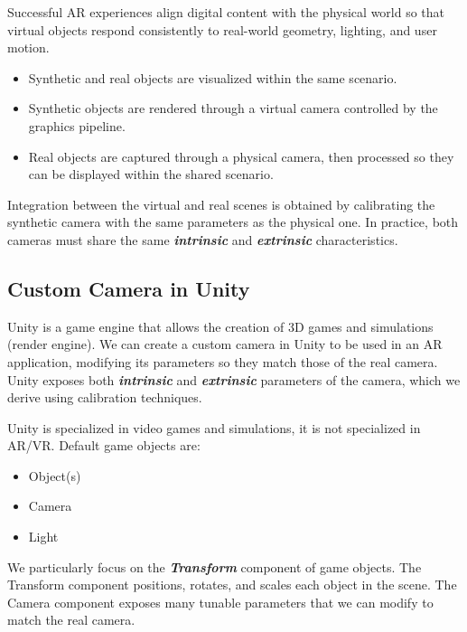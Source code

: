 \documentclass[11pt,a4paper]{article}
\theoremstyle{definition}
\theoremstyle{plain}
\theoremstyle{remark}
\begin{document}
\begin{tcolorbox}[colback=blue!4!white,colframe=blue!60!black,title=\textbf{Key Concept: Mixed Reality}]
Successful AR experiences align digital content with the physical world so that
virtual objects respond consistently to real-world geometry, lighting, and user motion.
\end{tcolorbox}

\begin{itemize}
    \item Synthetic and real objects are visualized within the same scenario.
    \item Synthetic objects are rendered through a virtual camera controlled by the graphics pipeline.
    \item Real objects are captured through a physical camera, then processed so they can be displayed within the shared scenario.
\end{itemize}

Integration between the virtual and real scenes is obtained by calibrating the synthetic camera with the same parameters as the physical one.
In practice, both cameras must share the same \textbf{\textit{intrinsic}} and \textbf{\textit{extrinsic}} characteristics.

\subsection{Custom Camera in Unity}
Unity is a game engine that allows the creation of 3D games and simulations (render engine).
We can create a custom camera in Unity to be used in an AR application, modifying its parameters so they match those of the real camera.
Unity exposes both \textbf{\textit{intrinsic}} and \textbf{\textit{extrinsic}} parameters of the camera, which we derive using calibration techniques.

Unity is specialized in video games and simulations, it is not specialized in AR/VR.
Default game objects are:
\begin{itemize}
    \item Object(s)
    \item Camera
    \item Light
\end{itemize}

We particularly focus on the \textbf{\textit{Transform}} component of game objects.
The Transform component positions, rotates, and scales each object in the scene.
The Camera component exposes many tunable parameters that we can modify to match the real camera.
\end{document}
